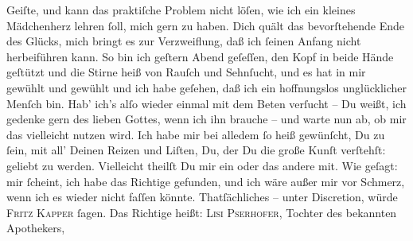 \begin{ledgroupsized}[t]{13cm}
               Geiſte, und kann das praktiſche Problem nicht löſen, wie ich ein kleines Mädchenherz lehren ſoll, mich
               gern zu haben. Dich quält das bevorſtehende Ende des Glücks, mich bringt es zur
               Verzweiflung, daß ich ſeinen Anfang nicht herbeiführen kann. So bin ich geſtern{ }Abend geſeſſen, den Kopf in beide Hände geſtützt und die Stirne heiß von
               Rauſch und Sehnſucht, und es hat in mir gewühlt und gewühlt und ich habe geſehen, daß
               ich ein hoffnungslos unglücklicher Menſch bin. Hab’ ich’s alſo wieder einmal mit dem
               Beten verſucht – Du weißt, ich gedenke gern des lieben Gottes, wenn ich ihn brauche –
               und warte nun ab, ob mir das vielleicht nutzen wird. Ich habe mir bei alledem ſo heiß
               gewünſcht, Du zu ſein, mit all' Deinen Reizen und \strikeout{\textcolor{gray}{Lüſten}} Liſten, Du, der Du die große Kunſt verſtehſt: geliebt zu werden. Vielleicht
               theilſt Du mir ein oder das andere \label{K_L02649-5v}\label{K_L02649-5h} mit. Wie
               geſagt: mir ſcheint, ich habe das Richtige gefunden, und ich wäre außer mir vor
               Schmerz, wenn ich es wieder nicht faſſen könnte.\pend
           \pstart
           Thatſächliches – unter Discretion, würde \textsc{Fritz Kapper} ſagen. Das Richtige heißt: {\pb}\textsc{Lisi Pserhofer}, Tochter des bekannten
                  Apothekers, \label{K_L02649-6v}
\end{ledgroupsized}
